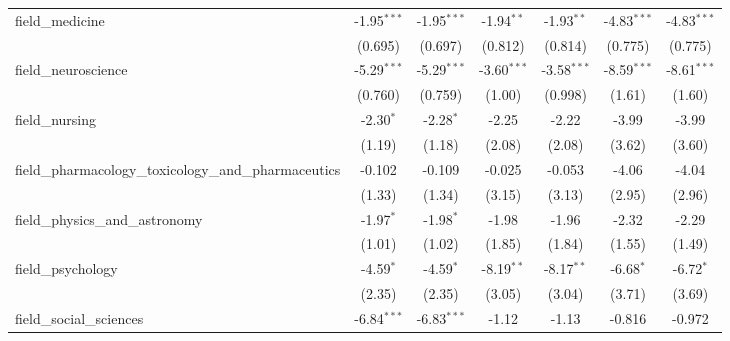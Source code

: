 \begin{tabular}{lcccccc}
   field\_medicine                                             & -1.95$^{***}$  & -1.95$^{***}$  & -1.94$^{**}$   & -1.93$^{**}$   & -4.83$^{***}$  & -4.83$^{***}$\\   
                                                               & (0.695)        & (0.697)        & (0.812)        & (0.814)        & (0.775)        & (0.775)\\   
   field\_neuroscience                                         & -5.29$^{***}$  & -5.29$^{***}$  & -3.60$^{***}$  & -3.58$^{***}$  & -8.59$^{***}$  & -8.61$^{***}$\\   
                                                               & (0.760)        & (0.759)        & (1.00)         & (0.998)        & (1.61)         & (1.60)\\   
   field\_nursing                                              & -2.30$^{*}$    & -2.28$^{*}$    & -2.25          & -2.22          & -3.99          & -3.99\\   
                                                               & (1.19)         & (1.18)         & (2.08)         & (2.08)         & (3.62)         & (3.60)\\   
   field\_pharmacology\_toxicology\_and\_pharmaceutics         & -0.102         & -0.109         & -0.025         & -0.053         & -4.06          & -4.04\\   
                                                               & (1.33)         & (1.34)         & (3.15)         & (3.13)         & (2.95)         & (2.96)\\   
   field\_physics\_and\_astronomy                              & -1.97$^{*}$    & -1.98$^{*}$    & -1.98          & -1.96          & -2.32          & -2.29\\   
                                                               & (1.01)         & (1.02)         & (1.85)         & (1.84)         & (1.55)         & (1.49)\\   
   field\_psychology                                           & -4.59$^{*}$    & -4.59$^{*}$    & -8.19$^{**}$   & -8.17$^{**}$   & -6.68$^{*}$    & -6.72$^{*}$\\   
                                                               & (2.35)         & (2.35)         & (3.05)         & (3.04)         & (3.71)         & (3.69)\\   
   field\_social\_sciences                                     & -6.84$^{***}$  & -6.83$^{***}$  & -1.12          & -1.13          & -0.816         & -0.972\\   

\end{tabular}
